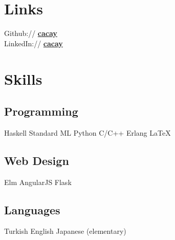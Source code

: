 \documentclass[letterpaper]{deedy-resume} %
\begin{document}
\begin{minipage}[t]{0.33\textwidth} %


\section{Links} 

Github:// \href{https://github.com/cacay}{\bf cacay} \\
LinkedIn:// \href{https://www.linkedin.com/in/cacay}{\bf cacay}

\sectionspace %


\section{Skills}

\subsection{Programming}

Haskell \textbullet{} Standard ML \textbullet{} Python \textbullet{} C/C++ \textbullet{} Erlang \textbullet{} \LaTeX\

\sectionspace %


\subsection{Web Design}

Elm \textbullet{} AngularJS \textbullet{} Flask

\sectionspace %


\subsection{Languages}

Turkish \textbullet{} English \textbullet{} Japanese (elementary)


\end{minipage}
\end{document}
